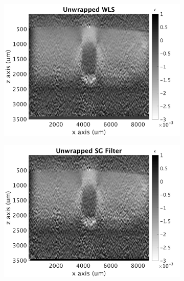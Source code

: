 \begin{figure}[hb!]
	\centering
    \begin{subfigure}{0.49\textwidth}
    	\centering
        \includegraphics[width=\textwidth]{figures/unwrapped_wls}
	\end{subfigure}
    \begin{subfigure}{0.49\textwidth}
    	\centering
        \includegraphics[width=\textwidth]{figures/unwrapped_sg}
	\end{subfigure}
    \\
    \begin{subfigure}{0.49\textwidth}
    	\centering

\end{subfigure}
\end{figure}
